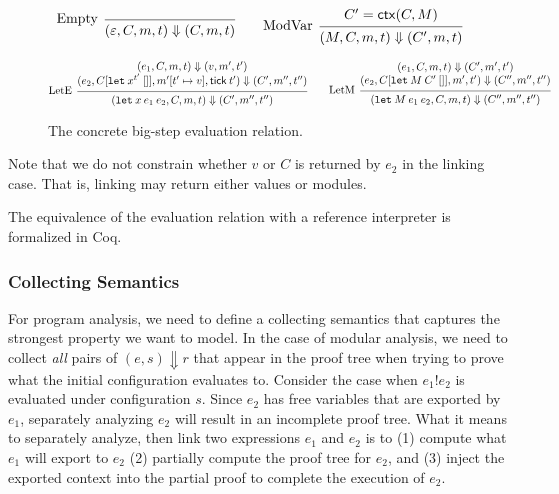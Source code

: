 \documentclass[acmsmall,screen,review]{acmart}
\theoremstyle{definition}
\newcommand*{\mem}{m}
\newcommand*{\link}[2]{{#1}\mathtt{!}{#2}}
\newcommand*{\tick}{\mathsf{tick}}
\newcommand*{\modctx}{\mathsf{ctx}}
\begin{document}
\begin{figure}[h!]
  \[
    \begin{prooftree}
      \infer[left label=Empty]0{
      (\varepsilon, C, \mem, t)
      \Downarrow
      (C, \mem, t)
      }
    \end{prooftree}\qquad
    \begin{prooftree}
      \hypo{C'=\modctx(C,M)}
      \infer[left label=ModVar]1{
      (M, C, \mem, t)
      \Downarrow
      (C', \mem, t)
      }
    \end{prooftree}
  \]

  \[
    \begin{prooftree}
      \hypo{
        \begin{matrix}
          (e_{1}, C, \mem, t)
          \Downarrow
          (v, \mem', t') \\
          (e_{2}, C[\mathtt{let}\:x^{t'}\:[]], \mem'[t'\mapsto v], \tick\:t')
          \Downarrow
          (C', \mem'', t'')
        \end{matrix}
      }
      \infer[left label=LetE]1{
      (\mathtt{let}\:x\:e_1\:e_2, C, \mem, t)
      \Downarrow
      (C', \mem'', t'')
      }
    \end{prooftree}\qquad
    \begin{prooftree}
      \hypo{
        \begin{matrix}
          (e_{1}, C, \mem, t)
          \Downarrow
          (C', \mem', t') \\
          (e_{2}, C[\mathtt{let}\:M\:C'\:[]], \mem', t')
          \Downarrow
          (C'', \mem'', t'')
        \end{matrix}
      }
      \infer[left label=LetM]1{
      (\mathtt{let}\:M\:e_{1}\:e_{2}, C, \mem, t)
      \Downarrow
      (C'', \mem'', t'')
      }
    \end{prooftree}
  \]
  \caption{The concrete big-step evaluation relation.}
  \label{fig:conceval}
\end{figure}
Note that we do not constrain whether $v$ or $C$ is returned by $e_{2}$ in the linking case.
That is, linking may return either values or modules.

The equivalence of the evaluation relation with a reference interpreter is formalized in Coq.

\subsubsection{Collecting Semantics}

For program analysis, we need to define a collecting semantics that captures the strongest property we want to model.
In the case of modular analysis, we need to collect \emph{all} pairs of $(e,s)\Downarrow r$ that appear in the proof tree when trying to prove what the initial configuration evaluates to.
Consider the case when $\link{e_1}{e_2}$ is evaluated under configuration $s$.
Since $e_2$ has free variables that are exported by $e_1$, separately analyzing $e_2$ will result in an incomplete proof tree.
What it means to separately analyze, then link two expressions $e_1$ and $e_2$ is to (1) compute what $e_1$ will export to $e_2$ (2) partially compute the proof tree for $e_2$, and (3) inject the exported context into the partial proof to complete the execution of $e_2$.
\end{document}
